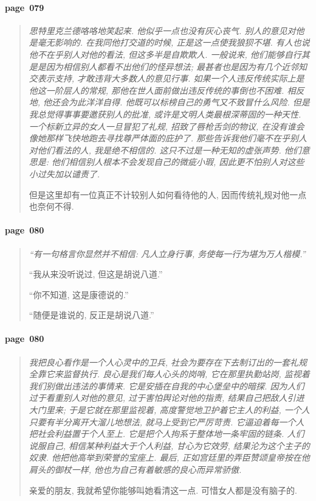 \paragraph*{page~079}
\begin{quotation}
    \itshape
    思特里克兰德咯咯地笑起来. 他似乎一点也没有灰心丧气. 别人的意见对他是毫无影响的. 在我同他打交道的时候, 正是这一点使我狼狈不堪. 有人也说他不在乎别人对他的看法, 但这多半是自欺欺人. 一般说来, 他们能够自行其是是因为相信别人都看不出他们的怪异想法; 最甚者也是因为有几个近邻知交表示支持, 才敢违背大多数人的意见行事. 如果一个人违反传统实际上是他这一阶层人的常规, 那他在世人面前做出违反传统的事倒也不困难. 相反地, 他还会为此洋洋自得. 他既可以标榜自己的勇气又不致冒什么风险. 但是我总觉得事事要邀获别人的批准, 或许是文明人类最根深蒂固的一种天性. 一个标新立异的女人一旦冒犯了礼规, 招致了唇枪舌剑的物议, 在没有谁会像她那样飞快地跑去寻找尊严体面的庇护了. 那些告诉我他们毫不在乎别人对他们看法的人, 我是绝不相信的. 这只不过是一种无知的虚张声势. 他们意思是: 他们相信别人根本不会发现自己的微疵小瑕, 因此更不怕别人对这些小过失加以谴责了. 

    但是这里却有一位真正不计较别人如何看待他的人, 因而传统礼规对他一点也奈何不得. 
\end{quotation}

\paragraph*{page~080}
\begin{quotation}
    \itshape
    ``有一句格言你显然并不相信: 凡人立身行事, 务使每一行为堪为万人楷模.''

    ``我从来没听说过, 但这是胡说八道.''

    ``你不知道, 这是康德说的.''

    ``随便是谁说的, 反正是胡说八道.''
\end{quotation}

\paragraph*{page~080}
\begin{quotation}
    \itshape
    我把良心看作是一个人心灵中的卫兵, 社会为要存在下去制订出的一套礼规全靠它来监督执行. 良心是我们每人心头的岗哨, 它在那里执勤站岗, 监视着我们别做出违法的事情来. 它是安插在自我的中心堡垒中的暗探. 因为人们过于看重别人对他的意见, 过于害怕舆论对他的指责, 结果自己把敌人引进大门里来; 于是它就在那里监视着, 高度警觉地卫护着它主人的利益, 一个人只要有半分离开大溜儿地想法, 就马上受到它严厉苛责. 它逼迫着每一个人把社会利益置于个人至上. 它是把个人拘系于整体地一条牢固的链条. 人们说服自己, 相信某种利益大于个人利益, 甘心为它效劳, 结果沦为这个主子的奴隶. 他把他高举到荣誉的宝座上. 最后, 正如宫廷里的弄臣赞颂皇帝按在他肩头的御杖一样, 他也为自己有着敏感的良心而异常骄傲.

    亲爱的朋友, 我就希望你能够叫她看清这一点. 可惜女人都是没有脑子的. 
\end{quotation}

